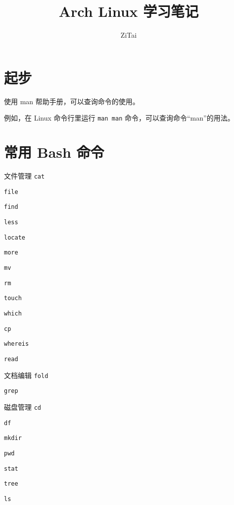 \documentclass{ctexart}
\title{Arch Linux 学习笔记}
\author{ZiTai}
\date{\zhdate{2023/7/9}}
\begin{document}
\maketitle

\clearpage
\tableofcontents

\clearpage
\section{起步}
    使用 man 帮助手册，可以查询命令的使用。
    
    例如，在 Linux 命令行里运行 \texttt{man man} 命令，可以查询命令“man”的用法。

\clearpage
\section{常用 Bash 命令}
\begin{mybox}{文件管理}
    \texttt{cat}

    \texttt{file}

    \texttt{find}

    \texttt{less}

    \texttt{locate}

    \texttt{more}

    \texttt{mv}

    \texttt{rm}

    \texttt{touch}

    \texttt{which}

    \texttt{cp}

    \texttt{whereis}

    \texttt{read}
\end{mybox}

\begin{mybox}{文档编辑}
    \texttt{fold}

    \texttt{grep}
\end{mybox}

\begin{mybox}{磁盘管理}
    \texttt{cd}

    \texttt{df}

    \texttt{mkdir}

    \texttt{pwd}

    \texttt{stat}

    \texttt{tree}

    \texttt{ls}
\end{mybox}
\end{document}
